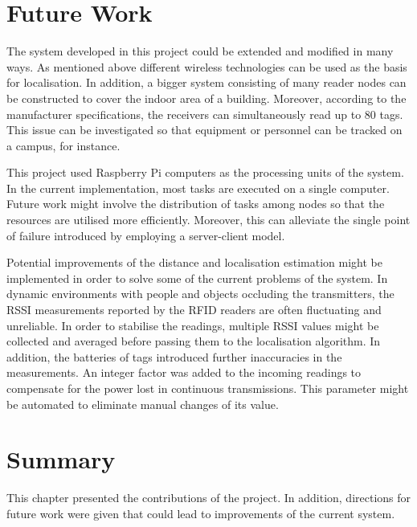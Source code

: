 \section{Future Work}
\label{sec:future}

The system developed in this project could be extended and modified in many ways. As mentioned above different wireless technologies can be used as the basis for localisation. In addition, a bigger system consisting of many reader nodes can be constructed to cover the indoor area of a building. Moreover, according to the manufacturer specifications, the receivers can simultaneously read up to 80 tags. This issue can be investigated so that equipment or personnel can be tracked on a campus, for instance. 

This project used Raspberry Pi computers as the processing units of the system. In the current implementation, most tasks are executed on a single computer. Future work might involve the distribution of tasks among nodes so that the resources are utilised more efficiently. Moreover, this can alleviate the single point of failure introduced by employing a server-client model.

Potential improvements of the distance and localisation estimation might be implemented in order to solve some of the current problems of the system. In dynamic environments with people and objects occluding the transmitters, the RSSI measurements reported by the RFID readers are often fluctuating and unreliable. In order to stabilise the readings, multiple RSSI values might be collected and averaged before passing them to the localisation algorithm. In addition, the batteries of tags introduced further inaccuracies in the measurements. An integer factor was added to the incoming readings to compensate for the power lost in continuous transmissions. This parameter might be automated to eliminate manual changes of its value.

\section{Summary}
This chapter presented the contributions of the project. In addition, directions for future work were given that could lead to improvements of the current system.
